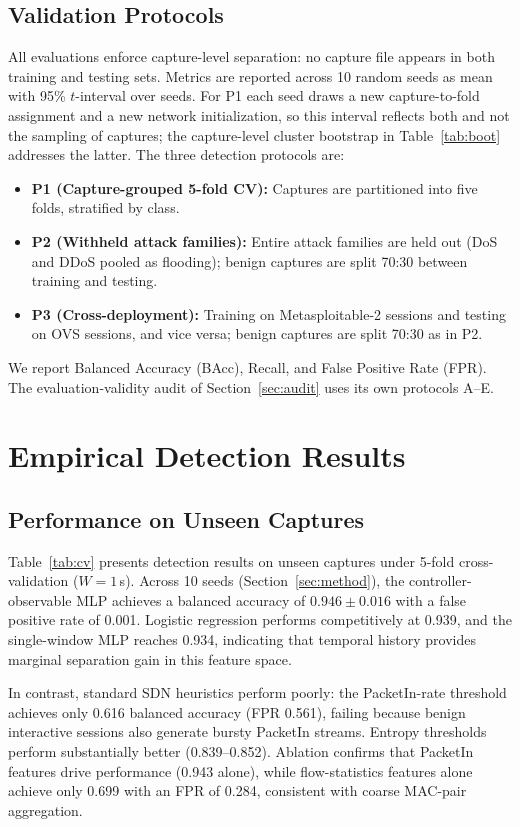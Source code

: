 \documentclass[journal]{IEEEtran}
\begin{document}
\subsection{Validation Protocols}
All evaluations enforce capture-level separation: no capture file appears in both training and testing sets. Metrics are reported across 10 random seeds as mean with 95\% $t$-interval over seeds. For P1 each seed draws a new capture-to-fold assignment and a new network initialization, so this interval reflects both and not the sampling of captures; the capture-level cluster bootstrap in Table~\ref{tab:boot} addresses the latter. The three detection protocols are:
\begin{itemize}
    \item \textbf{P1 (Capture-grouped 5-fold CV):} Captures are partitioned into five folds, stratified by class.
    \item \textbf{P2 (Withheld attack families):} Entire attack families are held out (DoS and DDoS pooled as flooding); benign captures are split 70:30 between training and testing.
    \item \textbf{P3 (Cross-deployment):} Training on Metasploitable-2 sessions and testing on OVS sessions, and vice versa; benign captures are split 70:30 as in P2.
\end{itemize}
We report Balanced Accuracy (BAcc), Recall, and False Positive Rate (FPR). The evaluation-validity audit of Section~\ref{sec:audit} uses its own protocols A--E.

\section{Empirical Detection Results}\label{sec:results}
\subsection{Performance on Unseen Captures}
Table~\ref{tab:cv} presents detection results on unseen captures under 5-fold cross-validation ($W{=}1$\,s). Across 10 seeds (Section~\ref{sec:method}), the controller-observable MLP achieves a balanced accuracy of $0.946\pm0.016$ with a false positive rate of 0.001. Logistic regression performs competitively at 0.939, and the single-window MLP reaches 0.934, indicating that temporal history provides marginal separation gain in this feature space.

In contrast, standard SDN heuristics perform poorly: the PacketIn-rate threshold achieves only 0.616 balanced accuracy (FPR 0.561), failing because benign interactive sessions also generate bursty PacketIn streams. Entropy thresholds perform substantially better (0.839--0.852). Ablation confirms that PacketIn features drive performance (0.943 alone), while flow-statistics features alone achieve only 0.699 with an FPR of 0.284, consistent with coarse MAC-pair aggregation.
\end{document}
